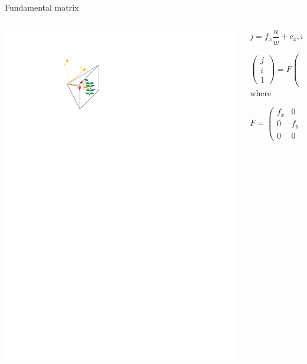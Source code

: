 \documentclass[aspectratio=169]{beamer}
\begin{document}
\begin{frame}{Fundamental matrix}
    \begin{columns}
        \begin{column}{0.4\textwidth}
            \centering
            \includegraphics[width=\textwidth]{images/cam.pdf}
        \end{column}
        \begin{column}{0.6\textwidth}
            $$j = f_x \frac{u}{w} + c_x, i = f_y \frac{v}{w} + c_y$$

            $$\left( \begin{array}{c}
    j \\ i \\ 1
    \end{array} \right) = F \left( \begin{array}{c}
    u/w \\ v/w \\ 1
    \end{array} \right)$$ where

    $$F = \left( \begin{array}{ccc}
            f_x & 0 & c_x \\ 0 & f_y & c_y \\ 0 & 0 & 1
    \end{array} \right)$$
        \end{column}
    \end{columns}
\end{frame}
\end{document}
